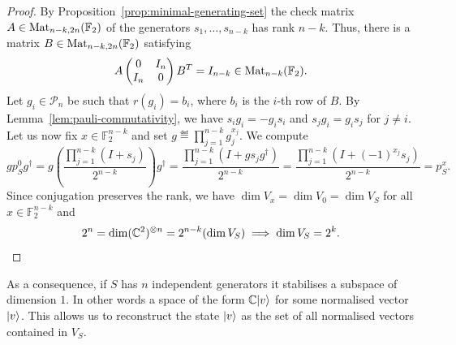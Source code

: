 \documentclass[a4paper, oneside, 12pt]{amsart}
\newcommand*{\PauliGroup}{\ensuremath{\mathcal{P}}}
\begin{document}
\begin{proof}
  By Proposition~\ref{prop:minimal-generating-set} the check matrix \(A\in \operatorname{Mat}_{n-k, 2n}(\mathbb{F}_{2})\) of the generators  \(s_1, \dots, s_{n-k}\) has rank \(n-k\).
  Thus, there is a matrix \(B\in \operatorname{Mat}_{n-k, 2n}( \mathbb{F}_{2})\) satisfying
  \begin{equation*}
    A
    \begin{pmatrix}
      0 & I_{n} \\
      I_{n} & 0
    \end{pmatrix}
    B^{T} = I_{n-k} \in \operatorname{Mat}_{n-k}( \mathbb{F}_{2}).
  \end{equation*}
  Let \(g_{i}\in \PauliGroup_n\) be such that \(r(g_{i})= b_{i}\), where \(b_{i}\) is the \(i\)-th row of \(B\).
  By Lemma~\ref{lem:pauli-commutativity}, we have \(s_{i} g_{i} = - g_{i} s_{i}\) and \(s_{j} g_{i} = g_{i} s_{j}\) for \(j\neq i\).
  Let us now  fix \(x \in \mathbb{F}_{2}^{n-k}\) and set \(g \eqdef \prod_{j=1}^{n-k} g_j^{x_j}\).
  We compute
  \begin{equation*}
    g p^0_S g^\dagger
    = g \left( \frac{\prod_{j=1}^{n-k} (I + s_j)}{2^{n-k}} \right) g^\dagger
    = \frac{\prod_{j=1}^{n-k} (I + g s_j g^\dagger)}{2^{n-k}}
    = \frac{\prod_{j=1}^{n-k} (I + (-1)^{x_j} s_j)}{2^{n-k}} = p^x_S.
  \end{equation*}
  Since conjugation preserves the rank, we have \(\dim V_x = \dim V_0 = \dim V_S\) for all \(x \in \mathbb{F}_2^{n-k}\) and
  \begin{equation*}
    2^{n} = \dim ( \mathbb{C}^{2})^{\otimes n } = 2^{n-k}(\dim V_S)  \implies \dim V_{S} = 2^{k}.\qedhere
  \end{equation*}
\end{proof}

As a consequence, if \(S\) has \(n\) independent generators it stabilises a subspace of dimension \(1\). In other words a space of the form \( \mathbb{C} \lvert v\rangle\) for some normalised vector \(\lvert v\rangle\).
This allows us to reconstruct the state \(\lvert v\rangle\) as the set of all normalised vectors contained in \(V_{S}\).
\end{document}
